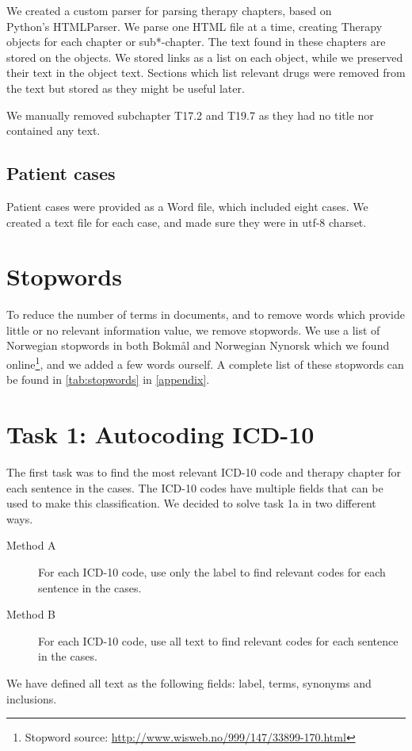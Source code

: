 We created a custom parser for parsing therapy chapters, based on\\
Python's HTMLParser. We parse one HTML file at a time, creating Therapy
objects for each chapter or sub*-chapter. The text found in these chapters are
stored on the objects. We stored links as a list on each object, while we
preserved their text in the object text. Sections which list relevant drugs
were removed from the text but stored as they might be useful later.

We manually removed subchapter T17.2 and T19.7 as they had no title nor
contained any text.

\subsection{Patient cases}
Patient cases were provided as a Word file, which included eight cases. We
created a text file for each case, and made sure they were in utf-8 charset.


\section{Stopwords}
To reduce the number of terms in documents, and to remove words which provide
little or no relevant information value, we remove stopwords.
We use a list of Norwegian stopwords in both Bokmål and Norwegian Nynorsk
which we found
online\footnote{Stopword source: \url{http://www.wisweb.no/999/147/33899-170.html}},
and we added a few words ourself. A complete list of these stopwords can
be found in \autoref{tab:stopwords} in \autoref{appendix}.


\section{Task 1: Autocoding ICD-10}
\label{sec:task1}
The first task was to find the most relevant ICD-10 code and therapy chapter for each sentence in the cases. The ICD-10 codes have multiple fields that can be used to make this classification. We decided to solve task 1a in two different ways.
\begin{description}
	\item[Method A] For each ICD-10 code, use only the label to find relevant codes for each sentence in the cases. 
	\item[Method B] For each ICD-10 code, use all text to find relevant codes for each sentence in the cases.
\end{description}
We have defined all text as the following fields: label, terms, synonyms and inclusions.

